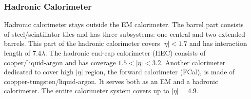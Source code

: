 \subsubsection{Hadronic Calorimeter}

Hadronic calorimeter stays outside the EM calorimeter. The barrel part consists of steel/scintillator tiles and has three subsystems: one central and two extended barrels. This part of the hadronic calorimeter covers $|\eta|<1.7$ and has interaction length of 7.4$\lambda$. The hadronic end-cap calorimeter (HEC) consists of cooper/liquid-argon and has coverage $1.5<|\eta|<3.2$. Another calorimeter dedicated to cover high $|\eta|$ region, the forward calorimeter (FCal), is made of coopper-tungsten/liquid-argon. It serves both as an EM and a hadronic calorimeter. The entire calorimeter system covers up to $|\eta|=4.9$.




